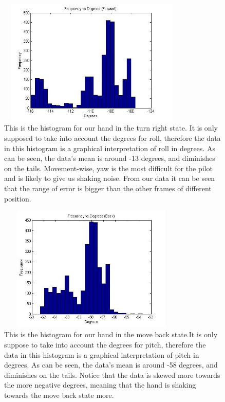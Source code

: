 \documentclass[letterpaper,english, 12pt]{article}
\begin{document}
\begin{figure}[t]
	\centering
	\includegraphics[height=6cm,width=90mm]{pics/forwardHistogram1.jpg}
	\caption{This is the histogram for our hand in the turn right state. It is only supposed to take into account the degrees for roll, therefore the data in this histogram is a graphical interpretation of roll in degrees.  As can be seen, the data's mean is around -13 degrees, and diminishes on the tails. Movement-wise, yaw is the most difficult for the pilot and is likely to give us shaking noise.  From our data it can be seen that the range of error is bigger than the other frames of different position.}
\end{figure}

\begin{figure}[t]
	\centering
	\includegraphics[height=6cm,width=90mm]{pics/backwardHistogram1.jpg}
	\caption{This is the histogram for our hand in the move back state.It is only suppose to take into account the degrees for pitch, therefore the data in this histogram is a graphical interpretation of pitch in degrees.  As can be seen, the data's mean is around -58 degrees, and diminishes on the tails. Notice that the data is skewed more towards the more negative degrees, meaning that the hand is shaking towards the move back state more.} 

\end{figure}
\end{document}

